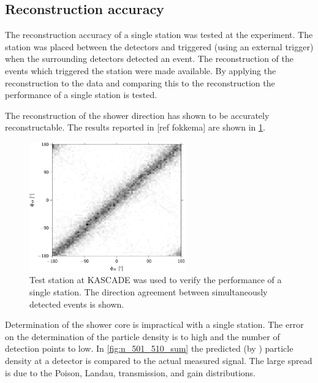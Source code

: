 \subsection{Reconstruction accuracy}

The reconstruction accuracy of a single \hisparc station was tested at the \kascade experiment. The \hisparc station was placed between the \kascade detectors and triggered (using an external trigger) when the surrounding detectors detected an event. The \kascade reconstruction of the events which triggered the \hisparc station were made available. By applying the reconstruction to the data and comparing this to the \kascade reconstruction the performance of a single station is tested.

The reconstruction of the shower direction has shown to be accurately reconstructable. The results reported in [ref fokkema] are shown in \cref{fig:azimuth_kascade_minn1}.

\begin{figure}
    \centering
    \includegraphics[width=0.6\textwidth]
                    {plots/station/azimuth_kascade_minn1}
    \caption{Test station at KASCADE was used to verify the performance of a single station. The direction agreement between simultaneously detected events is shown.}
    \label{fig:azimuth_kascade_minn1}
\end{figure}

Determination of the shower core is impractical with a single station. The error on the determination of the particle density is to high and the number of detection points to low. In \cref{fig:n_501_510_sum} the predicted (by \kascade) particle density at a detector is compared to the actual measured signal. The large spread is due to the Poison, Landau, transmission, and \pmt gain distributions.

